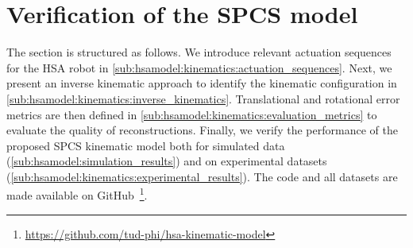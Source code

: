 \section{Verification of the \gls{SPCS} model}\label{sec:hsamodel:verification_kinematics}
The section is structured as follows. We introduce relevant actuation sequences for the \gls{HSA} robot in \ref{sub:hsamodel:kinematics:actuation_sequences}.
Next, we present an inverse kinematic approach to identify the kinematic configuration in \ref{sub:hsamodel:kinematics:inverse_kinematics}.
Translational and rotational error metrics are then defined in \ref{sub:hsamodel:kinematics:evaluation_metrics} to evaluate the quality of reconstructions. %
Finally, we verify the performance of the proposed \gls{SPCS} kinematic model both for simulated data (\ref{sub:hsamodel:simulation_results}) and on experimental datasets (\ref{sub:hsamodel:kinematics:experimental_results}).
The code and all datasets are made available on GitHub~\footnote{\scriptsize \url{https://github.com/tud-phi/hsa-kinematic-model}}.

